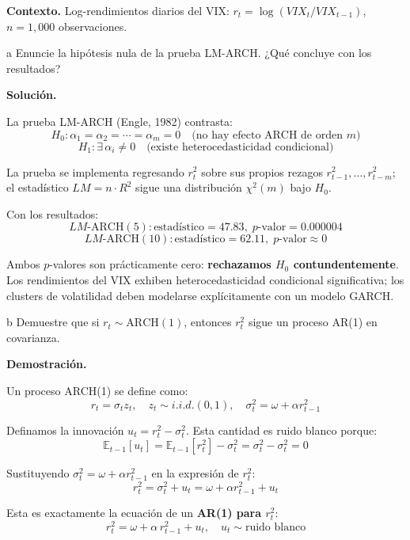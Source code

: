 \documentclass[11pt,a4paper]{article}
\newcommand{\E}{\mathbb{E}}
\newcommand{\sigmat}{\sigma^2_t}
\begin{document}
\textbf{Contexto.} Log-rendimientos diarios del VIX: $r_t = \log(VIX_t/VIX_{t-1})$, $n=1{,}000$ observaciones.

\begin{cajaInciso}{a}
Enuncie la hipótesis nula de la prueba LM-ARCH. ¿Qué concluye con los resultados?
\end{cajaInciso}

\textbf{Solución.}

La prueba LM-ARCH (Engle, 1982) contrasta:
\[
H_0: \alpha_1 = \alpha_2 = \cdots = \alpha_m = 0
\quad \text{(no hay efecto ARCH de orden } m\text{)}
\]
\[
H_1: \exists\, \alpha_i \neq 0 \quad \text{(existe heterocedasticidad condicional)}
\]

La prueba se implementa regresando $r_t^2$ sobre sus propios rezagos $r_{t-1}^2,\ldots,r_{t-m}^2$; el estadístico $LM = n\cdot R^2$ sigue una distribución $\chi^2(m)$ bajo $H_0$.

Con los resultados:
\[
LM\text{-ARCH}(5): \text{estadístico} = 47.83,\; p\text{-valor} = 0.000004
\]
\[
LM\text{-ARCH}(10): \text{estadístico} = 62.11,\; p\text{-valor} \approx 0
\]

Ambos $p$-valores son prácticamente cero: \textbf{rechazamos $H_0$ contundentemente}. Los rendimientos del VIX exhiben heterocedasticidad condicional significativa; los clusters de volatilidad deben modelarse explícitamente con un modelo GARCH.

\begin{cajaInciso}{b}
Demuestre que si $r_t \sim \text{ARCH}(1)$, entonces $r_t^2$ sigue un proceso AR(1) en covarianza.
\end{cajaInciso}

\textbf{Demostración.}

Un proceso ARCH(1) se define como:
\[
r_t = \sigma_t z_t, \quad z_t \sim i.i.d.(0,1), \quad \sigmat = \omega + \alpha r_{t-1}^2
\]

Definamos la innovación $u_t = r_t^2 - \sigmat$. Esta cantidad es ruido blanco porque:
\[
\E_{t-1}[u_t] = \E_{t-1}[r_t^2] - \sigmat = \sigmat - \sigmat = 0
\]

Sustituyendo $\sigmat = \omega + \alpha r_{t-1}^2$ en la expresión de $r_t^2$:
\[
r_t^2 = \sigmat + u_t = \omega + \alpha r_{t-1}^2 + u_t
\]

Esta es exactamente la ecuación de un \textbf{AR(1) para $r_t^2$}:
\[
\boxed{r_t^2 = \omega + \alpha\, r_{t-1}^2 + u_t, \quad u_t \sim \text{ruido blanco}}
\]
\end{document}
